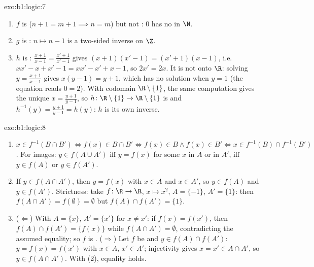 \begin{solution}{exo:b1:logic:7}
\begin{enumerate}
  \item $f$ is  ($n + 1 = m + 1 \implies n = m$) but not
        : $0$ has no  in $\N$.
  \item $g$ is : $n \mapsto n - 1$ is a two-sided inverse on
        $\Z$.
  \item $h$ is : $\frac{x+1}{x-1} = \frac{x'+1}{x'-1}$ gives
        $(x+1)(x'-1) = (x'+1)(x-1)$, i.e.\ $xx' - x + x' - 1 = xx' -
        x' + x - 1$, so $2x' = 2x$. It is not  onto $\R$:
        solving $y = \frac{x+1}{x-1}$ gives $x(y - 1) = y + 1$, which
        has no solution when $y = 1$ (the equation reads $0 = 2$).
        With codomain $\R \setminus \{1\}$, the same computation gives
        the unique  $x = \frac{y+1}{y-1}$, so
        $h \colon \R \setminus \{1\} \to \R \setminus \{1\}$ is
         and $h^{-1}(y) = \frac{y+1}{y-1} = h(y)$: $h$ is its
        own inverse.
\end{enumerate}
\end{solution}

\begin{solution}{exo:b1:logic:8}
\begin{enumerate}
  \item $x \in f^{-1}(B \cap B') \iff f(x) \in B \cap B' \iff f(x) \in
        B \land f(x) \in B' \iff x \in f^{-1}(B) \cap f^{-1}(B')$.
        For images: $y \in f(A \cup A')$ iff $y = f(x)$ for some $x$
        in $A$ or in $A'$, iff $y \in f(A)$ or $y \in f(A')$.
  \item If $y \in f(A \cap A')$, then $y = f(x)$ with $x \in A$ and
        $x \in A'$, so $y \in f(A)$ and $y \in f(A')$. Strictness:
        take $f \colon \R \to \R$, $x \mapsto x^2$, $A = \{-1\}$,
        $A' = \{1\}$: then $f(A \cap A') = f(\emptyset) = \emptyset$
        but $f(A) \cap f(A') = \{1\}$.
  \item ($\Leftarrow$) With $A = \{x\}$, $A' = \{x'\}$ for $x \neq
        x'$: if $f(x) = f(x')$, then $f(A) \cap f(A') = \{f(x)\}$
        while $f(A \cap A') = \emptyset$, contradicting the assumed
        equality; so $f$ is . ($\Rightarrow$) Let $f$ be
         and $y \in f(A) \cap f(A')$: $y = f(x) = f(x')$ with
        $x \in A$, $x' \in A'$; injectivity gives $x = x' \in A \cap
        A'$, so $y \in f(A \cap A')$. With (2), equality holds.
\end{enumerate}
\end{solution}

